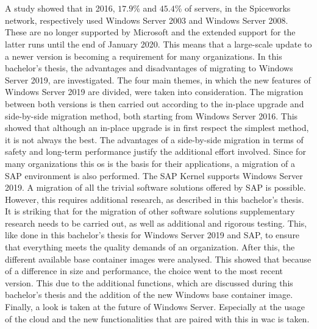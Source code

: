 \chapter*{}
A study showed that in 2016, {$17.9$}\% and {$45.4$}\% of servers, in the Spiceworks network, respectively used Windows Server 2003 and Windows Server 2008. \autocite{Tsai2016} 
These are no longer supported by Microsoft and the extended support for the latter runs until the end of January 2020. 
This means that a large-scale update to a newer version is becoming a requirement for many organizations. 
In this bachelor's thesis, the advantages and disadvantages of migrating to Windows Server 2019, are investigated. 
The four main themes, in which the new features of Windows Server 2019 are divided, were taken into consideration. 
The migration between both versions is then carried out according to the in-place upgrade and side-by-side migration method, both starting from Windows Server 2016. 
This showed that although an in-place upgrade is in first respect the simplest method, it is not always the best. 
The advantages of a side-by-side migration in terms of safety and long-term performance justify the additional effort involved.
Since for many organizations this \acrshort{os} is the basis for their applications, a migration of a SAP environment is also performed. 
The SAP Kernel supports Windows Server 2019. 
A migration of all the trivial software solutions offered by SAP is possible.
However, this requires additional research, as described in this bachelor's thesis.
It is striking that for the migration of other software solutions supplementary research needs to be carried out, as well as additional and rigorous testing. 
This, like done in this bachelor's thesis for Windows Server 2019 and SAP, to ensure that everything meets the quality demands of an organization.
After this, the different available base container images were analysed. 
This showed that because of a difference in size and performance, the choice went to the most recent version. 
This due to the additional functions, which are discussed during this bachelor's thesis and the addition of the new Windows base container image.
Finally, a look is taken at the future of Windows Server. 
Especially at the usage of the cloud and the new functionalities that are paired with this in \acrlong{wac} is taken. 
